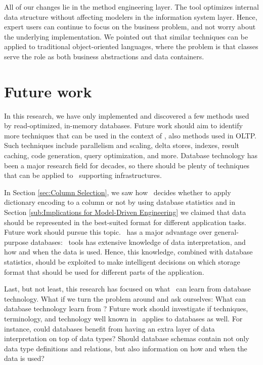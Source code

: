 All of our changes lie in the method engineering layer. The tool optimizes internal data structure without affecting modelers in the information system layer. Hence, expert users can continue to focus on the business problem, and not worry about the underlying implementation. We pointed out that similar techniques can be applied to traditional object-oriented languages, where the problem is that classes serve the role as both business abstractions and data containers.

\section{Future work}
\label{sec:Future work}
In this research, we have only implemented and discovered a few methods used by read-optimized, in-memory databases. Future work should aim to identify more techniques that can be used in the context of \mde, also methods used in OLTP. Such techniques include parallelism and scaling, delta stores, indexes, result caching, code generation, query optimization, and more. Database technology has been a major research field for decades, so there should be plenty of techniques that can be applied to \mdd~supporting infrastructures.

In Section \ref{sec:Column Selection}, we saw how \gap~decides whether to apply dictionary encoding to a column or not by using database statistics and in Section \ref{sub:Implications for Model-Driven Engineering} we claimed that data should be represented in the best-suited format for different application tasks. Future work should pursue this topic. \mde~has a major advantage over general-purpose databases: \mdd~tools has extensive knowledge of data interpretation, and how and when the data is used. Hence, this knowledge, combined with database statistics, should be exploited to make intelligent decisions on which storage format that should be used for different parts of the application.

Last, but not least, this research has focused on what \mde~can learn from database technology. What if we turn the problem around and ask ourselves: What can database technology learn from \mde? Future work should investigate if techniques, terminology, and technology well known in \mde~applies to databases as well. For instance, could databases benefit from having an extra layer of data interpretation on top of data types? Should database schemas contain not only data type definitions and relations, but also information on how and when the data is used?

